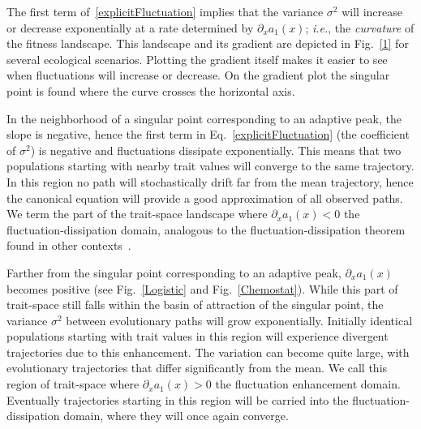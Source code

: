 The first term of~\eqref{explicitFluctuation} implies that the variance $\sigma^2$ will increase or decrease exponentially at a rate determined by $\partial_x a_1(x)$; \emph{i.e.}, the \emph{curvature} of the fitness landscape.  This landscape and its gradient are depicted in Fig.~\ref{1} for several ecological scenarios.   Plotting the gradient itself makes it easier to see when fluctuations will increase or decrease.  On the gradient plot the singular point is found where the curve crosses the horizontal axis.
 
In the neighborhood of a singular point corresponding to an adaptive
peak, the slope is negative, hence the first term in Eq.~\eqref{explicitFluctuation} (the coefficient of $\sigma^2$) is negative and fluctuations dissipate exponentially.  This means that two populations starting with nearby trait values will converge to the same trajectory.  In this region no path will stochastically drift far from the mean trajectory, hence the canonical equation will provide a good approximation of all observed paths.  We term the part of the trait-space landscape where $ \partial_x a_1(x) < 0$ the fluctuation-dissipation domain, analogous to the fluctuation-dissipation theorem found in other contexts~\citep{vankampen_book2001}.  
 
Farther from the singular point corresponding to an adaptive peak,
$\partial_x a_1(x)$ becomes positive (see Fig.~\ref{Logistic} and Fig.~\ref{Chemostat}).  While this part of trait-space still falls within the basin of attraction of the singular point, the variance $\sigma^2$ between evolutionary paths will grow exponentially.  Initially identical populations starting with trait values in this region will experience divergent trajectories due to this enhancement.  The variation can become quite large, with evolutionary trajectories that differ significantly from the mean.  We call this region of trait-space where $\partial_x a_1(x) > 0$ the fluctuation enhancement domain.  Eventually trajectories starting in this region will be carried into the fluctuation-dissipation domain, where they will once again converge.  

